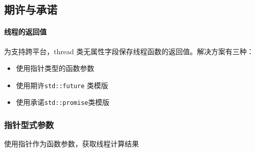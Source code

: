 \documentclass[UTF8,a4paper,12pt]{ctexbook}
\begin{document}
	\subsection{期许与承诺}
		\paragraph{线程的返回值}
			为支持跨平台，thread 类无属性字段保存线程函数的返回值。解决方案有三种：
			\begin{itemize}[itemindent = 2em]
				\item 使用指针类型的函数参数
				\item 使用期许\verb|std::future| 类模版
				\item 使用承诺\verb|std::promise|类模版
			\end{itemize}	
	
		\subsubsection{指针型式参数}
			使用指针作为函数参数，获取线程计算结果
			
\end{document}
